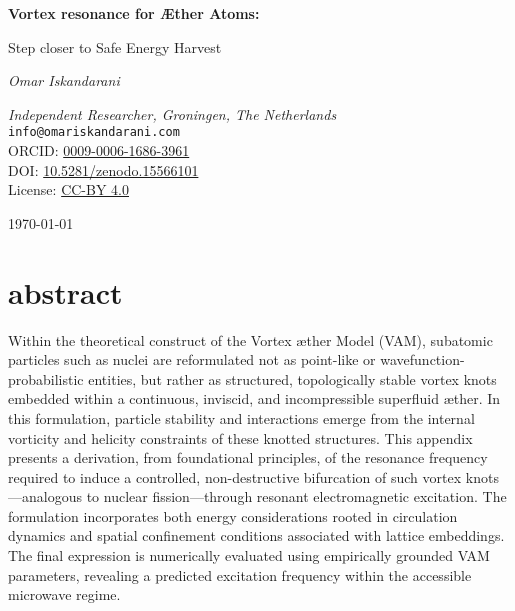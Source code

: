 \documentclass[a4paper, aps,preprint,superscriptaddress, 12pt]{revtex4}
\begin{document}
        \thispagestyle{empty}
        \centering
        \vspace*{2cm}

        {\Huge\bfseries Vortex resonance for Æther Atoms:\par}
        \vspace{0.5cm}
        {\Large Step closer to Safe Energy Harvest \par}
        \vspace{2cm}

        {\Large\itshape Omar Iskandarani\par}
        \vspace{0.5cm}
        \textit{Independent Researcher, Groningen, The Netherlands} \\
        \texttt{info@omariskandarani.com} \\
        ORCID: \href{https://orcid.org/0009-0006-1686-3961}{0009-0006-1686-3961} \\
        DOI: \href{https://doi.org/10.5281/zenodo.15566101}{10.5281/zenodo.15566101} \\
        License: \href{https://creativecommons.org/licenses/by/4.0/}{CC-BY 4.0} \\

        \vfill
        {\large \today\par}

        \vspace{1.5cm}

        \section*{abstract}
            Within the theoretical construct of the Vortex \ae{}ther Model (VAM), subatomic particles such as nuclei are reformulated not as point-like or wavefunction-probabilistic entities, but rather as structured, topologically stable vortex knots embedded within a continuous, inviscid, and incompressible superfluid \ae{}ther. In this formulation, particle stability and interactions emerge from the internal vorticity and helicity constraints of these knotted structures. This appendix presents a derivation, from foundational principles, of the resonance frequency required to induce a controlled, non-destructive bifurcation of such vortex knots—analogous to nuclear fission—through resonant electromagnetic excitation. The formulation incorporates both energy considerations rooted in circulation dynamics and spatial confinement conditions associated with lattice embeddings. The final expression is numerically evaluated using empirically grounded VAM parameters, revealing a predicted excitation frequency within the accessible microwave regime.
\end{document}
